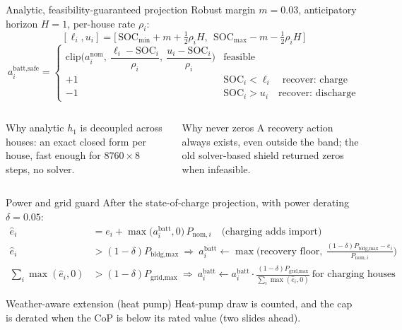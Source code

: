 \documentclass[aspectratio=169,10pt]{beamer}
\newcommand{\SOC}{\mathrm{SOC}}
\begin{document}
\begin{frame}{Analytic, feasibility-guaranteed projection}
Robust margin $m = 0.03$, anticipatory horizon $H = 1$, per-house rate $\rho_i$:
\[
[\ell_i, u_i] = \Big[\,\SOC_{\min} + m + \tfrac12 \rho_i H,\ \ \SOC_{\max} - m - \tfrac12 \rho_i H\,\Big]
\]
\[
a^{\text{batt,safe}}_i =
\begin{cases}
\mathrm{clip}\Big(a^{\text{nom}}_i,\ \dfrac{\ell_i - \SOC_i}{\rho_i},\ \dfrac{u_i - \SOC_i}{\rho_i}\Big) & \text{feasible}\\[8pt]
+1 & \SOC_i < \ell_i \quad\text{recover: charge}\\
-1 & \SOC_i > u_i \quad\text{recover: discharge}
\end{cases}
\]
\begin{columns}[T]
\begin{block}{Why analytic}
$h_1$ is decoupled across houses: an exact closed form per house, fast enough for $8760 \times 8$ steps, no solver.
\end{block}
\begin{block}{Why never zeros}
A recovery action always exists, even outside the band; the old solver-based shield returned zeros when infeasible.
\end{block}
\end{columns}
\end{frame}

\begin{frame}{Power and grid guard}
After the state-of-charge projection, with power derating $\delta = 0.05$:
\begin{align*}
\hat e_i &= e_i + \max\big(a^{\text{batt}}_i, 0\big)\, P_{\text{nom},i} \quad\text{(charging adds import)}\\
\hat e_i &> (1-\delta) P_{\text{bldg,max}} \ \Rightarrow\ a^{\text{batt}}_i \leftarrow \max\Big(\text{recovery floor},\ \frac{(1-\delta)P_{\text{bldg,max}} - e_i}{P_{\text{nom},i}}\Big)\\
\textstyle\sum_i \max(\hat e_i,0) &> (1-\delta) P_{\text{grid,max}} \ \Rightarrow\ a^{\text{batt}}_i \leftarrow a^{\text{batt}}_i \cdot \frac{(1-\delta) P_{\text{grid,max}}}{\sum_i \max(\hat e_i,0)}\ \text{for charging houses}
\end{align*}
\begin{block}{Weather-aware extension (heat pump)}
Heat-pump draw is counted, and the cap is derated when the CoP is below its rated value (two slides ahead).
\end{block}
\end{frame}
\end{document}
